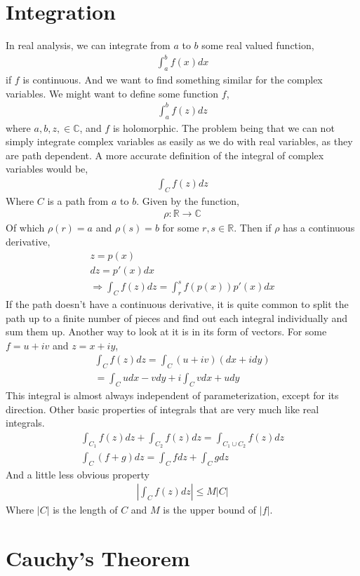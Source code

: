 \documentclass{article}
\begin{document}
\section{Integration}
In real analysis, we can integrate from $a$ to $b$ some real valued function,
\begin{gather*}
	\int_{a}^{b} f(x) dx
\end{gather*}
if $f$ is continuous. And we want to find something similar for the complex variables. We might
want to define some function $f$,
\begin{gather*}
	\int_{a}^{b} f(z) dz
\end{gather*}
where $a, b, z, \in \mathbb{C}$, and $f$ is holomorphic. The problem being that we can not simply
integrate complex variables as easily as we do with real variables, as they are path dependent. A
more accurate definition of the integral of complex variables would be,
\begin{gather*}
	\int_{C}f(z)dz
\end{gather*}
Where $C$ is a path from $a$ to $b$. Given by the function,
\begin{gather*}
	\rho : \mathbb{R} \rightarrow \mathbb{C}
\end{gather*}
Of which $\rho(r) = a$ and $ \rho(s) = b$ for some $r, s \in \mathbb{R}$. Then if $\rho$ has a continuous
derivative,
\begin{gather*}
	z = p(x) \\
	dz = p'(x)dx \\
	\Rightarrow \int_{C}f(z)dz = \int_r^s f(p(x))p'(x)dx
\end{gather*}
If the path doesn't have a continuous derivative, it is quite common to split the path up to a finite number of
pieces and find out each integral individually and sum them up. Another way to look at it is in its form of vectors.
For some $f = u + iv$ and $z = x + iy$,
\begin{gather*}
	\int_C f(z)dz = \int_C (u + iv) (dx + idy) \\
	= \int_C udx - vdy + i \int_C vdx + udy
\end{gather*}
This integral is almost always independent of parameterization, except for its direction. Other basic properties
of integrals that are very much like real integrals.
\begin{gather*}
	\int_{C_1} f(z)dz + \int_{C_2} f(z)dz = \int_{C_1 \cup C_2} f(z)dz \\
	\int_C (f + g) dz = \int_C f dz + \int_C g dz
\end{gather*}
And a little less obvious property
\begin{gather*}
	|\int_C f(z) dz | \leq M|C|
\end{gather*}
Where $|C|$ is the length of $C$ and $M$ is the upper bound of $|f|$.
\section{Cauchy's Theorem}
\end{document}
